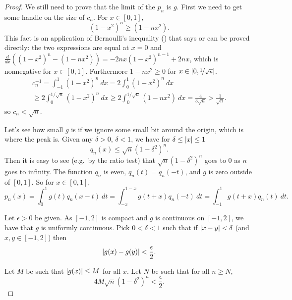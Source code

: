 \begin{proof}
We still need to prove that the limit of the $p_n$ is $g$.  First we need
to get some handle on the
size of $c_n$.  For $x \in [0,1]$,
\begin{equation*}
{(1-x^2)}^n \geq (1-nx^2) .
\end{equation*}
This fact is an application of Bernoulli's inequality
()
that says or can be 
proved directly:
the two expressions are equal at $x=0$ and 
$\frac{d}{dx}\left({(1-x^2)}^n - (1-nx^2)\right)
=-2nx{(1-x^2)}^{n-1}+2nx$, which is nonnegative for $x \in [0,1]$.
Furthermore $1-nx^2 \geq 0$ for $x \in [0,\nicefrac{1}{\sqrt{n}}]$.
\begin{multline*}
c_n^{-1}  = \int_{-1}^1 {(1-x^2)}^n ~ dx
= 2\int_0^1 {(1-x^2)}^n ~ dx \\
\geq 2\int_0^{1/\sqrt{n}} {(1-x^2)}^n ~ dx
\geq 2\int_0^{1/\sqrt{n}} (1-nx^2)  ~ dx
= \frac{4}{3\sqrt{n}}
> \frac{1}{\sqrt{n}} .
\end{multline*}
so $c_n < \sqrt{n}$.

Let's see how small $g$ is if we ignore some small bit around the origin,
which is where the peak is.
Given any $\delta > 0$, $\delta < 1$, we have for $\delta \leq \lvert {x} \rvert \leq
1$
\begin{equation*}
q_n(x) \leq \sqrt{n}{(1-\delta^2)}^n .
\end{equation*}
Then it is easy to see (e.g.\ by the ratio test) that
$\sqrt{n}{(1-\delta^2)}^n$ goes to 0 as $n$ goes to infinity.
The function $q_n$ is even, $q_n(t) = q_n(-t)$, and $g$
is zero outside of $[0,1]$.
So for $x \in [0,1]$,
\begin{equation*}
p_n(x) = 
\int_{0}^1 g(t)q_n(x-t)  ~ dt
=
\int_{-x}^{1-x} g(t+x)q_n(-t)  ~ dt
=
\int_{-1}^{1} g(t+x)q_n(t)  ~ dt .
\end{equation*}

Let $\epsilon > 0$ be given.
As $[-1,2]$ is compact and $g$ is continuous on $[-1,2]$, we have that $g$ is uniformly continuous.
Pick $0 < \delta < 1$ such that if
$\lvert {x-y} \rvert < \delta$ (and $x,y \in [-1,2]$) then
\begin{equation*}
\lvert {g(x)-g(y)} \rvert < \frac{\epsilon}{2} .
\end{equation*}

Let $M$ be such that $\lvert {g(x)} \rvert \leq M$ for all $x$.  Let $N$ be
such that for all $n \geq N$,
\begin{equation*}
4M\sqrt{n}{(1-\delta^2)}^n < \frac{\epsilon}{2} .
\end{equation*}


\end{proof}
